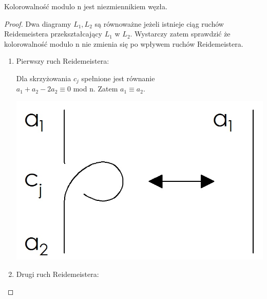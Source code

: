 \begin{twierdzenie} Kolorowalność modulo n jest niezmiennikiem węzła.
\end{twierdzenie}
\begin{proof}
Dwa diagramy $L_{1}, L_{2}$ są równoważne jeżeli istnieje ciąg ruchów Reidemeistera przekształcający $L_{1}$ w $L_{2}$. Wystarczy zatem sprawdzić że kolorowalność modulo n nie zmienia się po wpływem ruchów Reidemeistera.

\begin{enumerate} \item Pierwszy ruch Reidemeistera: 

	\begin{minipage}{0.5\textwidth}
	Dla skrzyżowania $c_{j}$ spełnione jest równanie \\ $a_{1}+a_{2}-2a_{2} \equiv 0$ mod n. Zatem $a_{1} \equiv a_{2}$.
	\end{minipage}
	\begin{minipage}{0.5\textwidth}
		\begin{center}
			\includegraphics[scale=0.2]{2/Obrazy/R1}
		\end{center}
	\end{minipage}
\item Drugi ruch Reidemeistera: 


\end{enumerate}
\end{proof}
